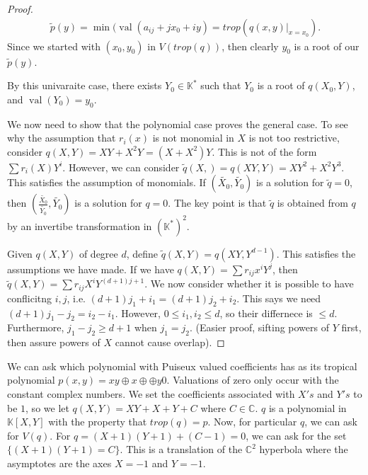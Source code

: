 \documentclass[12pt]{memoir}
\DeclareMathOperator{\val}{val}
\theoremstyle{definition}
\def\KK{{\mathbb K}}
\def\CC{{\mathbb C}}
\begin{document}
\begin{proof}
    \begin{align*}
        \tilde{p}(y) = \min(\val(a_{ij} + jx_0 + iy)= trop(q(x,y)|_{x=x_0}).
    \end{align*}
    Since we started with $(x_0,y_0)$ in $V(trop(q))$, then clearly $y_0$ is a root of our $\tilde{p}(y)$.


    By this univaraite case, there exists $Y_0 \in \KK^*$ such that $Y_0$ is a root of $q(X_0,Y)$, and $\val(Y_0)=y_0$.

    We now need to show that the polynomial case proves the general case. To see why the assumption that $r_i(x)$ is not monomial in $X$ is not too restrictive, consider $q(X,Y) = XY +X^2Y=(X+X^2)Y$. This is not of the form $\sum r_i(X)Y^i$. However, we can consider $\tilde{q}(X,)=q(XY,Y)=XY^2+X^2Y^3$. This satisfies the assumption of monomials. If $(\tilde{X_0},\tilde{Y_0})$ is a solution for $\tilde{q}=0$, then  $\left(\frac{\tilde{X_0}}{\tilde{Y_0} },\tilde{Y_0}  \right)$ is a solution for $q=0$. The key point is that $\tilde{q}$ is obtained from $q$ by an invertibe transformation in $(\KK^*)^2$.




    Given $q(X,Y)$ of degree $d$, define $\tilde{q}(X,Y) = q(XY, Y^{d-1})$. This satisfies the assumptions we have made. If we have $q(X,Y) = \sum r_{ij} x^iY^j$, then $\tilde{q}(X,Y) = \sum r_{ij}X^iY^{(d+1)j+1}$. We now consider whether it is possible to have conflicitng $i,j$, i.e. $(d+1)j_1+i_1=(d+1)j_2+i_2$. This says we need $(d+1)j_1-j_2=i_2-i_1$. However, $0\leq i_1,i_2 \leq d$, so their differnece is $\leq d$. Furthermore, $j_1-j_2 \geq d+1$ when $j_1=j_2$. (Easier proof, sifting powers of $Y$ first, then assure powers of $X$ cannot cause overlap).



    
\end{proof}

We can ask which polynomial with Puiseux valued coefficients has as its tropical polynomial $p(x,y)=xy\oplus x \oplus \oplus y 0$. Valuations of zero only occur with the constant complex numbers. We set the coefficients associated with $X's$ and $Y's$ to be $1$, so we let $q(X,Y)= XY+X+Y+C$ where $C \in \CC$. $q$ is a polynomial in $\KK[X,Y]$ with the property that $trop(q) = p$. Now, for particular $q$, we can ask for $V(q)$. For $q=(X+1)(Y+1)+(C-1)=0$, we can ask for the set $\{(X+1)(Y+1) = C\}$. This is a translation of the $\CC^2$ hyperbola where the asymptotes are the axes $X=-1$ and $Y=-1$.
\end{document}
